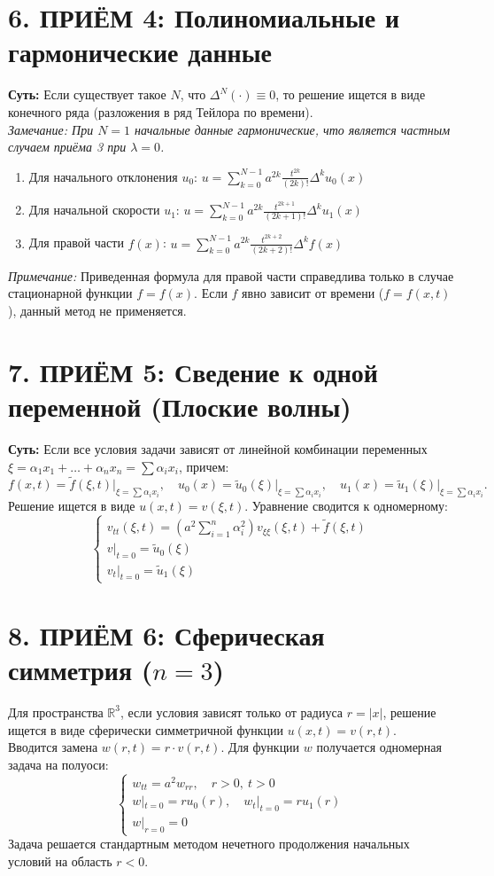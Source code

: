 \documentclass[a4paper,10pt]{article}
\begin{document}
\section{6. ПРИЁМ 4: Полиномиальные и гармонические данные}
\textbf{Суть:} Если существует такое $N$, что $\Delta^N(\cdot) \equiv 0$, то решение ищется в виде конечного ряда (разложения в ряд Тейлора по времени). \\
\textit{Замечание: При $N=1$ начальные данные гармонические, что является частным случаем приёма 3 при $\lambda = 0$.}
\begin{enumerate}
    \setlength{\itemsep}{0pt}
    \item Для начального отклонения $u_0$: \quad $u = \sum_{k=0}^{N-1} a^{2k} \frac{t^{2k}}{(2k)!} \Delta^k u_0(x)$ 
    \item Для начальной скорости $u_1$: \quad $u = \sum_{k=0}^{N-1} a^{2k} \frac{t^{2k+1}}{(2k+1)!} \Delta^k u_1(x)$ 
    \item Для правой части $f(x)$: \quad $u = \sum_{k=0}^{N-1} a^{2k} \frac{t^{2k+2}}{(2k+2)!} \Delta^k f(x)$
\end{enumerate}
\textit{Примечание:} Приведенная формула для правой части справедлива только в случае стационарной функции $f = f(x)$. Если $f$ явно зависит от времени ($f = f(x,t)$), данный метод не применяется.

\section{7. ПРИЁМ 5: Сведение к одной переменной (Плоские волны)}
\textbf{Суть:} Если все условия задачи зависят от линейной комбинации переменных $\xi = \alpha_1 x_1 + \dots + \alpha_n x_n = \sum \alpha_i x_i$, причем:
\[ f(x,t) = \tilde{f}(\xi, t)\Big|_{\xi = \sum \alpha_i x_i}, \quad u_0(x) = \tilde{u}_0(\xi)\Big|_{\xi = \sum \alpha_i x_i}, \quad u_1(x) = \tilde{u}_1(\xi)\Big|_{\xi = \sum \alpha_i x_i}. \]
Решение ищется в виде $u(x,t) = v(\xi, t)$. Уравнение сводится к одномерному:
\[ 
\begin{cases}
v_{tt}(\xi,t) = \left( a^2 \sum\limits_{i=1}^n \alpha_i^2 \right) v_{\xi\xi}(\xi,t) + \tilde{f}(\xi, t) \\
v|_{t=0} = \tilde{u}_0(\xi) \\
v_t|_{t=0} = \tilde{u}_1(\xi)
\end{cases}
\]

\section{8. ПРИЁМ 6: Сферическая симметрия ($n=3$)}
Для пространства $\mathbb{R}^3$, если условия зависят только от радиуса $r = |x|$, решение ищется в виде сферически симметричной функции $u(x,t) = v(r, t)$. \\
Вводится замена \textbf{$w(r,t) = r \cdot v(r,t)$}. Для функции $w$ получается одномерная задача на полуоси:
\[ 
\begin{cases} 
w_{tt} = a^2 w_{rr}, \quad r>0, \ t>0 \\ 
w|_{t=0} = r u_0(r), \quad w_t|_{t=0} = r u_1(r) \\ 
w|_{r=0} = 0 
\end{cases} 
\]
Задача решается стандартным методом нечетного продолжения начальных условий на область $r < 0$. 
\end{document}
